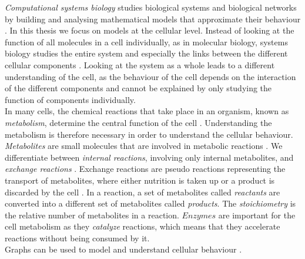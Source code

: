 \textit{Computational systems biology} studies biological systems and biological networks by building and analysing mathematical models that approximate their behaviour \cite{intro_computational_systems_biology}. In this thesis we focus on models at the cellular level.
Instead of looking at the function of all molecules in a cell individually, as in molecular biology, systems biology studies the entire system and especially the links between the different cellular components \cite{palsson_systems_biology}. 
Looking at the system as a whole leads to a different understanding of the cell, as the behaviour of the cell depends on the interaction of the different components \cite{intro_computational_systems_biology} and cannot be explained by only studying the function of components individually.\\
In many cells, the chemical reactions that take place in an organism, known as \textit{metabolism}, determine the central function of the cell \cite{intro_computational_systems_biology}. Understanding the metabolism is therefore necessary in order to understand the cellular behaviour. 
\textit{Metabolites} are small molecules that are involved in metabolic reactions \cite{intro_computational_systems_biology}. We differentiate between \textit{internal reactions}, involving only internal metabolites, and \textit{exchange reactions}%
. Exchange reactions are pseudo reactions representing the transport of metabolites, where either nutrition is taken up or a product is discarded by the cell \cite{fba_applications_and_challenges} . 
In a reaction, a set of metabolites called \textit{reactants} are converted into a different set of metabolites called \textit{products}. The \textit{stoichiometry} is the relative number of metabolites in a reaction. $Enzymes$ are important for the cell metabolism as they \textit{catalyze} reactions, which means that they accelerate reactions without being consumed by it.\\
Graphs can be used to model and understand cellular behaviour \cite{intro_computational_systems_biology}.
